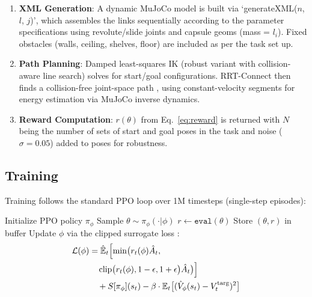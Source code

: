 \documentclass[defaultstyle,11pt]{thesis}
\begin{document}
\begin{enumerate}
    \item \textbf{XML Generation}: A dynamic MuJoCo model is built via `generateXML($n$, $l$, $j$)', which assembles the links sequentially according to the parameter specifications using revolute/slide joints and capsule geoms (mass = $l_i$). Fixed obstacles (walls, ceiling, shelves, floor) are included as per the task set up.
    \item \textbf{Path Planning}: Damped least-squares IK (robust variant with collision-aware line search) solves for start/goal configurations. RRT-Connect then finds a collision-free joint-space path \cite{kuffner2000rrt}, using constant-velocity segments for energy estimation via MuJoCo inverse dynamics.
    \item \textbf{Reward Computation}: \(r(\theta)\) from Eq.~\eqref{eq:reward} is returned with \(N\) being the number of sets of start and goal poses in the task and noise (\(\sigma=0.05\)) added to poses for robustness.
\end{enumerate}

\subsection{Training}

Training follows the standard PPO loop over 1M timesteps (single-step episodes):

\begin{algorithm}[H]
\caption{PMorph Training}
\label{alg:train}
\begin{algorithmic}[1]
\State Initialize PPO policy \(\pi_\phi\)
    \State Sample \(\theta \sim \pi_\phi(\cdot|\phi)\)
    \State \(r \gets \texttt{eval}(\theta)\) 
    \State Store \((\theta, r)\) in buffer
    \State Update \(\phi\) via the clipped surrogate loss \cite{schulman2017proximal}:
    \[
    \begin{aligned}
    \mathcal{L}(\phi) &= \hat{\mathbb{E}}_t \Bigl[ 
        \min\bigl( r_t(\phi) \hat{A}_t,\; \\
        &\quad \operatorname{clip}\bigl(r_t(\phi), 1-\epsilon, 1+\epsilon\bigr) \hat{A}_t \bigr) \Bigr] \\
        &\quad + S[\pi_\phi](s_t) - \beta \cdot \mathbb{E}_t \bigl[ (\hat{V}_\phi(s_t) - V_t^{\text{targ}})^2 \bigr]
    \end{aligned}
    \]
\EndFor
\end{algorithmic}
\end{algorithm}
\end{document}
